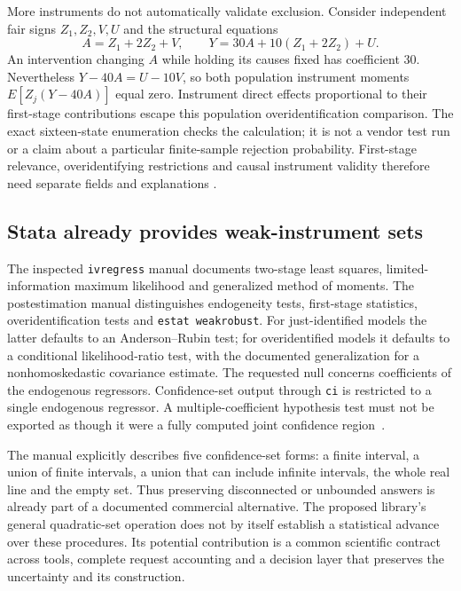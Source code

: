 More instruments do not automatically validate exclusion. Consider
independent fair signs $Z_1,Z_2,V,U$ and the structural equations
\[
 A=Z_1+2Z_2+V,\qquad
 Y=30A+10(Z_1+2Z_2)+U.
\]
An intervention changing $A$ while holding its causes fixed has coefficient
30. Nevertheless $Y-40A=U-10V$, so both population instrument moments
$E[Z_j(Y-40A)]$ equal zero. Instrument direct effects proportional to
their first-stage contributions escape this population overidentification
comparison. The exact sixteen-state enumeration checks the calculation;
it is not a vendor test run or a claim about a particular finite-sample
rejection probability. First-stage relevance, overidentifying restrictions
and causal instrument validity therefore need separate fields and explanations
\citep{exec13_ivrd_exact}.

\subsection{Stata already provides weak-instrument sets}

The inspected \texttt{ivregress} manual documents two-stage least squares,
limited-information maximum likelihood and generalized method of moments.
The postestimation manual distinguishes endogeneity tests, first-stage
statistics, overidentification tests and \texttt{estat weakrobust}.
For just-identified models the latter defaults to an Anderson--Rubin test;
for overidentified models it defaults to a conditional likelihood-ratio
test, with the documented generalization for a nonhomoskedastic covariance
estimate. The requested null concerns coefficients of the endogenous
regressors. Confidence-set output through \texttt{ci} is restricted to
a single endogenous regressor. A multiple-coefficient hypothesis test
must not be exported as though it were a fully computed joint confidence
region~\citep{exec13_ivrd_stata}.

The manual explicitly describes five confidence-set forms: a finite
interval, a union of finite intervals, a union that can include infinite
intervals, the whole real line and the empty set. Thus preserving
disconnected or unbounded answers is already part of a documented
commercial alternative. The proposed library's general quadratic-set
operation does not by itself establish a statistical advance over these
procedures. Its potential contribution is a common scientific contract
across tools, complete request accounting and a decision layer that
preserves the uncertainty and its construction.

